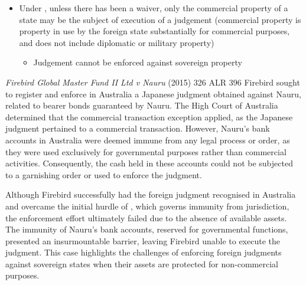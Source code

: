 \begin{itemize}
\begin{itemize}
\begin{itemize}
        \end{itemize}
    \end{itemize}
    \item Under , unless there has been a waiver, only the commercial property of a state may be the subject of execution of a judgement (commercial property is property in use by the foreign state substantially for commercial purposes, and does not include diplomatic or military property)
    \begin{itemize}
        \item Judgement cannot be enforced against sovereign property
    \end{itemize}
\end{itemize}

\begin{casedetails}{\textit{Firebird Global Master Fund II Ltd v Nauru} (2015) 326 ALR 396}
    \flushleft
    Firebird sought to register and enforce in Australia a Japanese judgment obtained against Nauru, related to bearer bonds guaranteed by Nauru. The High Court of Australia determined that the commercial transaction exception applied, as the Japanese judgment pertained to a commercial transaction. However, Nauru's bank accounts in Australia were deemed immune from any legal process or order, as they were used exclusively for governmental purposes rather than commercial activities. Consequently, the cash held in these accounts could not be subjected to a garnishing order or used to enforce the judgment.

    \flushleft

    Although Firebird successfully had the foreign judgment recognised in Australia and overcame the initial hurdle of , which governs immunity from jurisdiction, the enforcement effort ultimately failed due to the absence of available assets. The immunity of Nauru's bank accounts, reserved for governmental functions, presented an insurmountable barrier, leaving Firebird unable to execute the judgment. This case highlights the challenges of enforcing foreign judgments against sovereign states when their assets are protected for non-commercial purposes.

\end{casedetails}

